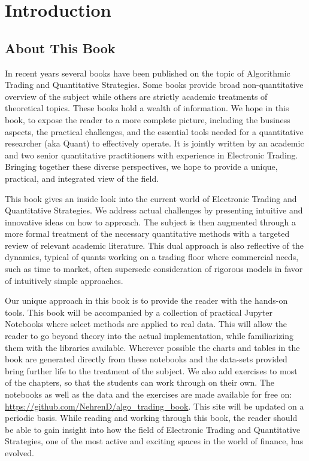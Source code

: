 \chapter{Introduction}\label{chap:ch_intro}
\section{About This Book}

In recent years several books have been published  on the topic of Algorithmic Trading and Quantitative Strategies. Some books provide broad non-quantitative overview of the subject while others are strictly academic treatments of theoretical topics. These books hold a wealth of  information. We hope in this book, to expose the reader to a more complete picture, including the business aspects, the practical challenges, and the essential tools needed for a quantitative researcher (aka Quant) to effectively operate. It is jointly written by an academic and two senior quantitative practitioners with experience in Electronic Trading. Bringing together these diverse perspectives, we hope to provide a unique, practical, and integrated view of the field.


This book gives an inside look into the current world of Electronic Trading and Quantitative Strategies. We address actual challenges by presenting intuitive and innovative ideas on how to approach. The subject is then augmented through a more formal treatment of the necessary quantitative methods with a targeted review of relevant academic literature. This dual approach is also reflective of the dynamics, typical of quants working on a trading floor where commercial needs, such as time to market, often supersede consideration of rigorous models in favor of intuitively simple approaches. 


Our unique approach in this book is to provide the reader with the hands-on tools. This book will be accompanied by a collection of practical Jupyter Notebooks where select methods are applied to real data. This will allow the reader to go beyond theory into the actual implementation, while familiarizing them with the libraries available. Wherever possible the charts and tables in the book are generated directly from these notebooks and the data-sets provided bring further life to the treatment of the subject. We also add exercises to most of the chapters, so that the students can work through on their own. The notebooks as well as the data and the exercises are made  available for free on: \url{https://github.com/NehrenD/algo_trading_book}. This site will be updated on a periodic basis. While reading and working through this book, the reader should be able to gain insight into how the field of Electronic Trading and Quantitative Strategies, one of the most active and exciting spaces in the world of finance, has evolved.



